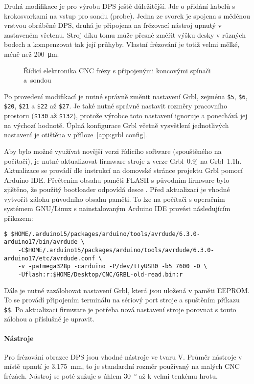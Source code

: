 Druhá modifikace je pro výrobu DPS ještě důležitější. Jde o přidání kabelů
s krokosvorkami na vstup pro sondu (\foreignlanguage{english}{probe}). Jedna ze
svorek je spojena s měděnou vrstvou obráběné DPS, druhá je připojena na
frézovací nástroj upnutý v zastaveném vřetenu. Stroj díku tomu může přesně
změřit výšku desky v různých bodech a kompenzovat tak její průhyby. Vlastní
frézování je totiž velmi mělké, méně než \SI{200}{\micro\meter}.

\begin{figure}[htbp]
    \centering
    \caption{%
        Řídicí elektronika CNC frézy s připojenými koncovými spínači a~sondou
    }
    \label{fig:CNC rizeni}
\end{figure}

Po provedení modifikací je nutné správně změnit nastavení Grbl, zejména
\verb|$5|, \verb|$6|, \verb|$20|, \verb|$21| a \verb|$22| až \verb|$27|.
Je také nutné správně nastavit rozměry pracovního prostoru (\verb|$130| až
\verb|$132|), protože výrobce toto nastavení ignoruje a ponechává jej na
výchozí hodnotě. Úplná konfigurace Grbl včetně vysvětlení jednotlivých
nastavení je otištěna v příloze~\vref{app:grbl config}.

Aby bylo možné využívat novější verzi řídicího software (spouštěného na
počítači), je nutné aktualizovat firmware stroje z verze Grbl~0.9j na
Grbl~1.1h. Aktualizace se provádí dle instrukcí na domovské stránce projektu
Grbl pomocí Arduino IDE. Přečtením obsahu paměti FLASH s původním firmware bylo
zjištěno, že použitý bootloader odpovídá desce . Před aktualizací je vhodné vytvořit zálohu původního obsahu
paměti. To lze na počítači s operačním systémem GNU/Linux s nainstalovaným
Arduino IDE provést následujícím příkazem:
\begin{lstlisting}[style=terminal]
$ $HOME/.arduino15/packages/arduino/tools/avrdude/6.3.0-arduino17/bin/avrdude \
    -C$HOME/.arduino15/packages/arduino/tools/avrdude/6.3.0-arduino17/etc/avrdude.conf \
    -v -patmega328p -carduino -P/dev/ttyUSB0 -b5 7600 -D \
    -Uflash:r:$HOME/Desktop/CNC/GRBL-old-read.bin:r
\end{lstlisting}
Dále je nutné zazálohovat nastavení Grbl, která jsou uložená v paměti EEPROM.
To se provádí připojením terminálu na sériový port stroje a spuštěním příkazu
\verb|$$|.
Po aktualizaci firmware je potřeba nová nastavení stroje porovnat s touto
zálohou a příslušně je upravit.

\paragraph{Nástroje}
Pro frézování obrazce DPS jsou vhodné nástroje ve tvaru V. Průměr nástroje
v místě upnutí je \SI{3,175}{\milli\meter}, to je standardní rozměr používaný
na malých CNC frézách. Nástroj se poté zužuje s úhlem
\SI{30}{\degree}\todo{nebo 15?} až k velmi tenkému hrotu.

